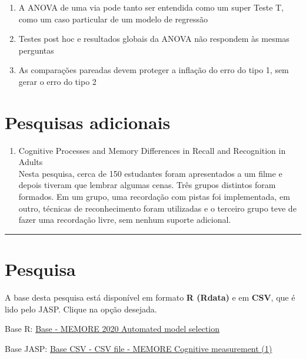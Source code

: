 \documentclass[
]{book}
\providecommand{\tightlist}{%
  \setlength{\itemsep}{0pt}\setlength{\parskip}{0pt}}
\begin{document}
\begin{explore}

\begin{enumerate}
\def\labelenumi{\arabic{enumi}.}
\tightlist
\item
  A ANOVA de uma via pode tanto ser entendida como um super Teste T, como um caso particular de um modelo de regressão\\
\item
  Testes post hoc e resultados globais da ANOVA não respondem às mesmas perguntas\\
\item
  As comparações pareadas devem proteger a inflação do erro do tipo 1, sem gerar o erro do tipo 2\\
\end{enumerate}

\end{explore}

\hypertarget{pesquisas-adicionais-3}{%
\section{Pesquisas adicionais}\label{pesquisas-adicionais-3}}

\begin{enumerate}
\def\labelenumi{\arabic{enumi}.}
\tightlist
\item
  Cognitive Processes and Memory Differences in Recall and Recognition in Adults\\
  Nesta pesquisa, cerca de 150 estudantes foram apresentados a um filme e depois tiveram que lembrar algumas cenas. Três grupos distintos foram formados. Em um grupo, uma recordação com pistas foi implementada, em outro, técnicas de reconhecimento foram utilizadas e o terceiro grupo teve de fazer uma recordação livre, sem nenhum suporte adicional.
\end{enumerate}

\begin{center}\rule{0.5\linewidth}{0.5pt}\end{center}

\hypertarget{pesquisa-4}{%
\section{Pesquisa}\label{pesquisa-4}}

\begin{base}

A base desta pesquisa está disponível em formato \textbf{R (Rdata)} e em \textbf{CSV}, que é lido pelo JASP. Clique na opção desejada.

Base R: \href{https://github.com/anovabr/mqt/raw/master/bases/Base\%20-\%20MEMORE\%202020\%20Automated\%20model\%20selection.RData}{Base - MEMORE 2020 Automated model selection}

Base JASP: \href{https://github.com/anovabr/mqt/raw/master/bases/bases_csv_jasp.zip}{Base CSV - CSV file - MEMORE Cognitive measurement (1)}

\end{base}
\end{document}
